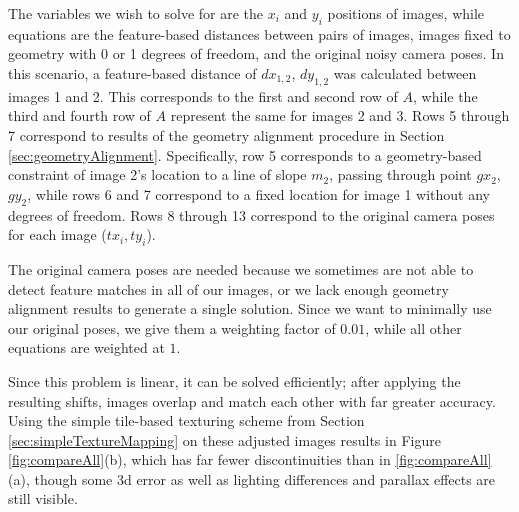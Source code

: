 \documentclass[]{spie}  %
\begin{document}
The variables we wish to solve for are the $x_i$ and $y_i$ positions
of images, while equations are the feature-based distances between
pairs of images, images fixed to geometry with 0 or 1 degrees of
freedom, and the original noisy camera poses. In this scenario, a
feature-based distance of $dx_{1,2}$, $dy_{1,2}$ was calculated
between images 1 and 2. This corresponds to the first and second row
of $A$, while the third and fourth row of $A$ represent the same for
images 2 and 3. Rows 5 through 7 correspond to results of the geometry
alignment procedure in Section
\ref{sec:geometryAlignment}. Specifically, row 5 corresponds to a
geometry-based constraint of image 2's location to a line of slope
$m_2$, passing through point $gx_2$, $gy_2$, while rows 6 and 7
correspond to a fixed location for image 1 without any degrees of
freedom. Rows 8 through 13 correspond to the original camera poses for
each image ($tx_i,ty_i$).



The original camera poses are needed because we sometimes are not able
to detect feature matches in all of our images, or we lack enough
geometry alignment results to generate a single solution. Since we
want to minimally use our original poses, we give them a weighting
factor of $0.01$, while all other equations are weighted at $1$.


Since this problem is linear, it can be solved efficiently; after
applying the resulting shifts, images overlap and match each other
with far greater accuracy. Using the simple tile-based texturing
scheme from Section \ref{sec:simpleTextureMapping} on these adjusted
images results in Figure \ref{fig:compareAll}(b), which has far fewer
discontinuities than in \ref{fig:compareAll}(a), though some 3d error
as well as lighting differences and parallax effects are still
visible.

\end{document}
